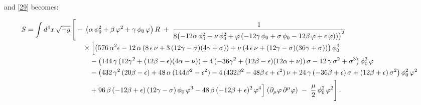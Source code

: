 \documentclass[aps,prd,reprint,preprintnumbers,showpacs,floatfix,nofootinbib,superscript address]{revtex4-2}
\begin{document}
and \ref{29} becomes:
\begin{widetext}
\begin{subequations}
\begin{align}  \label{42a}
S = \int d^4x\,\sqrt{-g}\,\Biggl[ 
  &-\,\bigl(\alpha\,\phi_0^2 + \beta\,\varphi^2 + \gamma\,\phi_0\,\varphi\bigr)\,R
  \;+\;
    \frac{1}{8\bigl(-12\alpha\,\phi_0^2 + \nu\,\phi_0^2 
      + \varphi\,(-12\gamma\,\phi_0 + \sigma\,\phi_0 - 12\beta\,\varphi + \epsilon\,\varphi))\bigr)^2}
    \nonumber\\[-0.5ex]
  &\quad\times
    \Bigl[
      \bigl(576\,\alpha^2\epsilon 
        -12\,\alpha\,(8\,\epsilon\,\nu + 3\,(12\gamma - \sigma)(4\gamma + \sigma))
        + \nu\,(4\,\epsilon\,\nu + (12\gamma - \sigma)(36\gamma + \sigma))
      \bigr)\,\phi_0^4 
    \nonumber\\
  &\quad\quad
    -\bigl(
      144\,\gamma\,(12\gamma^2 + (12\beta - \epsilon)(4\alpha - \nu))
      +4\,(-36\gamma^2 + (12\beta - \epsilon)(12\alpha + \nu))\,\sigma
      -12\,\gamma\,\sigma^2
      +\sigma^3
    \bigr)\,\phi_0^3\,\varphi
    \nonumber\\
  &\quad\quad
    -\bigl(
      432\,\gamma^2\,(20\beta - \epsilon)
      +48\,\alpha\,(144\beta^2 - \epsilon^2)
      -4\,(432\beta^2 - 48\beta\,\epsilon + \epsilon^2)\,\nu
      +24\,\gamma\,(-36\beta + \epsilon)\,\sigma
      +(12\beta + \epsilon)\,\sigma^2
    \bigr)\,\phi_0^2\,\varphi^2
    \nonumber\\
  &\quad\quad
    +96\,\beta\,(-12\beta + \epsilon)\,(12\gamma - \sigma)\,\phi_0\,\varphi^3
    -48\,\beta\,(-12\beta + \epsilon)^2\,\varphi^4
    \Bigr]
    \;(\partial_{\mu}\varphi\,\partial^{\mu}\varphi)
  \;-\;\frac{\mu}{2}\,\phi_0^2\,\varphi^2
\Biggr]\,.
\end{align}
\end{subequations}
\end{widetext}
\end{document}
